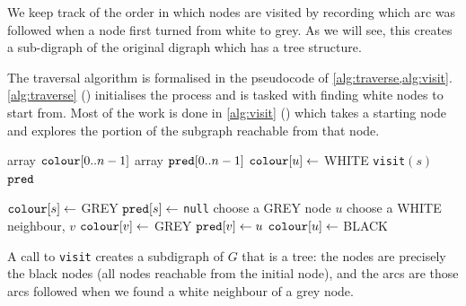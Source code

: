 We keep track of the order in which nodes are visited by recording which arc was followed when a node first turned from white to grey. 
As we will see, this creates a sub-digraph of the original digraph which has a tree structure.

The traversal algorithm is formalised in the pseudocode of \cref{alg:traverse,alg:visit}.  
\cref{alg:traverse} () initialises the process and is tasked with finding white nodes to start from. 
Most of the work is done in \cref{alg:visit} () which takes a starting node 
and explores the portion of the subgraph reachable from that node.

\begin{algorithm}[H]
  \caption{Basic graph traversal main routine: .}
  \label{alg:traverse}
\begin{algorithmic}[1]
	\State array $\operatorname{\text{\texttt{colour}}}[0..n-1]$ 
	\State array $\operatorname{\text{\texttt{pred}}}[0..n-1]$ 
	 
		\State $\operatorname{\text{\texttt{colour}}}[u] \gets $ WHITE 
	\EndFor
	  
			\State \texttt{visit}$(s)$ 
		\EndIf
	\EndFor
	\Return $\operatorname{\text{\texttt{pred}}}$ 
\EndFunction
\end{algorithmic}
\end{algorithm}

\begin{algorithm}[H]
  \caption{Basic graph traversal subroutine: .}
   \label{alg:visit}
\begin{algorithmic}[1]
	\State  $\operatorname{\text{\texttt{colour}}}[s] \gets$ GREY 
	\State $\operatorname{\text{\texttt{pred}}}[s] \gets$ \texttt{null} 
	 
		\State choose a GREY node $u$ 
			\State choose a WHITE neighbour, $v$ 
			\State $\operatorname{\text{\texttt{colour}}}[v] \gets $ GREY 
			\State $\operatorname{\text{\texttt{pred}}}[v] \gets u$ 
		\Else
			\State $\operatorname{\text{\texttt{colour}}}[u] \gets $ BLACK 
		\EndIf
	\EndWhile
\EndFunction
\end{algorithmic}
\end{algorithm}

A call to \texttt{visit} creates a subdigraph of $G$ that is a tree: 
the nodes are precisely the black nodes (all nodes reachable from the initial node), 
and the arcs are those arcs followed when we found a white neighbour of a grey node. 

